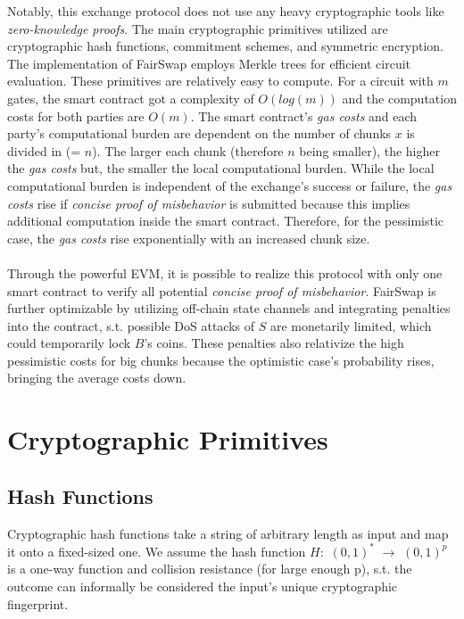 \documentclass{cacthesis}
\newcounter{protocol}
\begin{document}
        Notably, this exchange protocol does not use any heavy cryptographic tools like \textit{zero-knowledge proofs}. The main cryptographic primitives utilized are cryptographic hash functions, commitment schemes, and symmetric encryption. The implementation of FairSwap employs Merkle trees for efficient circuit evaluation. These primitives are relatively easy to compute. For a circuit with $m$ gates, the smart contract got a complexity of $O(log(m))$ and the computation costs for both parties are $O(m)$. The smart contract's \textit{gas costs} and each party's computational burden are dependent on the number of chunks $x$ is divided in (= $n$). The larger each chunk (therefore $n$ being smaller), the higher the \textit{gas costs} but, the smaller the local computational burden. While the local computational burden is independent of the exchange's success or failure, the \textit{gas costs} rise if \textit{concise proof of misbehavior} is submitted because this implies additional computation inside the smart contract. Therefore, for the pessimistic case, the \textit{gas costs} rise exponentially with an increased chunk size. \\\\
        Through the powerful EVM, it is possible to realize this protocol with only one smart contract to verify all potential \textit{concise proof of misbehavior}.
        FairSwap is further optimizable by utilizing off-chain state channels and integrating penalties into the contract, s.t. possible DoS attacks of $S$ are monetarily limited, which could temporarily lock $B$'s coins. These penalties also relativize the high pessimistic costs for big chunks because the optimistic case's probability rises, bringing the average costs down.
                
        \section{Cryptographic Primitives}
        \label{sec:CryptoPrimitives}
	        \subsection{Hash Functions}
	        \label{sub:HashFunctions}
	        Cryptographic hash functions take a string of arbitrary length as input and map it onto a fixed-sized one. We assume the hash function $H:$ $ (0, 1)^*$ $\rightarrow$ $(0, 1)^p$  is a one-way function and collision resistance (for large enough p), s.t. the outcome can informally be considered the input's unique cryptographic fingerprint. 
\end{document}
